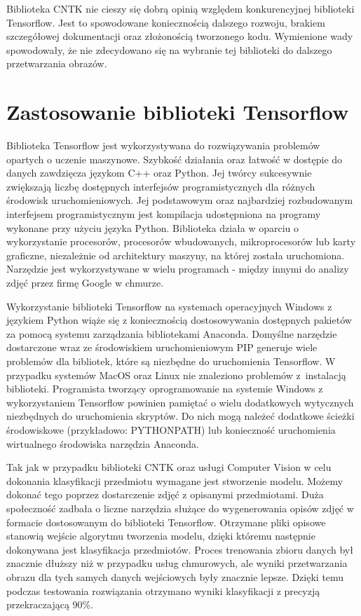 {{Biblioteka CNTK nie cieszy się dobrą opinią względem konkurencyjnej biblioteki Tensorflow. Jest to spowodowane koniecznością dalszego rozwoju, brakiem szczegółowej dokumentacji oraz złożonością tworzonego kodu. Wymienione wady spowodowały, że nie zdecydowano się na wybranie tej biblioteki do dalszego przetwarzania obrazów. 
}

\section{Zastosowanie biblioteki Tensorflow}{
Biblioteka Tensorflow\cite{Tensorflow} jest wykorzystywana do rozwiązywania problemów opartych o uczenie maszynowe. Szybkość działania oraz łatwość w dostępie do danych zawdzięcza językom C++ oraz Python. Jej twórcy sukcesywnie zwiększają liczbę dostępnych interfejsów programistycznych dla różnych środowisk uruchomieniowych. Jej podstawowym oraz najbardziej rozbudowanym interfejsem programistycznym jest kompilacja udostępniona na programy wykonane przy użyciu języka Python. Biblioteka działa w oparciu o wykorzystanie procesorów, procesorów wbudowanych, mikroprocesorów lub karty graficzne, niezależnie od architektury maszyny, na której została uruchomiona. Narzędzie jest wykorzystywane w wielu programach - między innymi do analizy zdjęć przez firmę Google w chmurze. 

Wykorzystanie biblioteki Tensorflow na systemach operacyjnych Windows z językiem Python wiąże się z koniecznością dostosowywania dostępnych pakietów za pomocą systemu zarządzania bibliotekami Anaconda\cite{Anaconda}. Domyślne narzędzie dostarczone wraz ze środowiskiem uruchomieniowym PIP generuje wiele problemów dla bibliotek, które są niezbędne do uruchomienia Tensorflow. W przypadku systemów MacOS oraz Linux nie znaleziono problemów z~instalacją biblioteki. Programista tworzący oprogramowanie na systemie Windows z wykorzystaniem Tensorflow powinien pamiętać o wielu dodatkowych wytycznych niezbędnych do uruchomienia skryptów. Do nich mogą należeć dodatkowe ścieżki środowiskowe (przykładowo: PYTHONPATH) lub konieczność uruchomienia wirtualnego środowiska narzędzia Anaconda. 

Tak jak w przypadku biblioteki CNTK oraz usługi Computer Vision w celu dokonania klasyfikacji przedmiotu wymagane jest stworzenie modelu. Możemy dokonać tego poprzez dostarczenie zdjęć z opisanymi przedmiotami. Duża społeczność zadbała o liczne narzędzia służące do wygenerowania opisów zdjęć w formacie dostosowanym do biblioteki Tensorflow. Otrzymane pliki opisowe stanowią wejście algorytmu tworzenia modelu, dzięki któremu następnie dokonywana jest klasyfikacja przedmiotów. Proces trenowania zbioru danych był znacznie dłuższy niż w przypadku usług chmurowych, ale wyniki przetwarzania obrazu dla tych samych danych wejściowych były znacznie lepsze. Dzięki temu podczas testowania rozwiązania otrzymano wyniki klasyfikacji z precyzją przekraczającą 90\%.

}}
